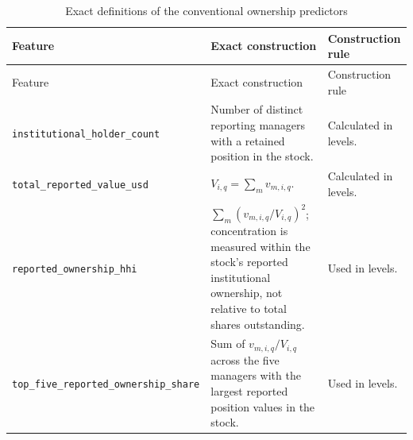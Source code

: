 \begingroup
\scriptsize
\setlength{\tabcolsep}{4pt}
\renewcommand{\arraystretch}{1.15}
\begin{longtable}{>{\raggedright\arraybackslash}p{}>{\raggedright\arraybackslash}p{}>{\raggedright\arraybackslash}p{}}
        \caption{Exact definitions of the conventional ownership predictors}
        \label{tab:ownership-feature-definitions}                                                                                                                                              \\
        \toprule
        Feature & Exact construction                                                                                                                                       & Construction rule \\
        \midrule
        \endfirsthead
        \toprule
        Feature & Exact construction                                                                                                                                       & Construction rule \\
        \midrule
        \endhead
        \bottomrule
        \endfoot
        \nolinkurl{institutional_holder_count}
                & Number of distinct reporting managers with a retained position in the stock.
                & Calculated in levels.                                                                                                                                                        \\
        \nolinkurl{total_reported_value_usd}
                & $V_{i,q}=\sum_m v_{m,i,q}$.
                & Calculated in levels.                                                                                                                                                        \\
        \nolinkurl{reported_ownership_hhi}
                & $\sum_m (v_{m,i,q}/V_{i,q})^2$; concentration is measured within the stock's reported institutional ownership, not relative to total shares outstanding.
                & Used in levels.                                                                                                                                                              \\
        \nolinkurl{top_five_reported_ownership_share}
                & Sum of $v_{m,i,q}/V_{i,q}$ across the five managers with the largest reported position values in the stock.
                & Used in levels.                                                                                                                                                              \\

\end{longtable}
